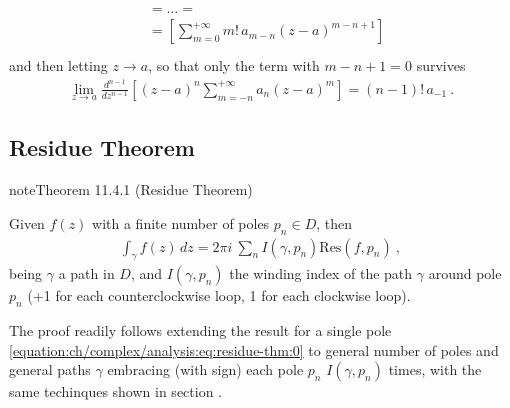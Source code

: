 \documentclass[letterpaper,10pt,english]{jupyterBook}
\begin{document}
\begin{itemize}
\begin{equation*}
\begin{split}
\begin{aligned}
    & = \dots = \\
    & = \left[ \sum_{m=0}^{+\infty} m! \, a_{m-n} (z-a)^{m-n+1} \right] \\
  \end{aligned}\end{split}
\end{equation*}
\sphinxAtStartPar
and then letting \(z \rightarrow a\), so that only the term with \(m-n+1 = 0\) survives
\begin{equation*}
\begin{split}\lim_{z \rightarrow a} \frac{d^{n-1}}{dz^{n-1}} \left[ (z-a)^n \sum_{m=-n}^{+\infty} a_n (z-a)^m \right] = (n-1)! \, a_{-1} \ .\end{split}
\end{equation*}
\end{itemize}


\subsection{Residue Theorem}
\label{\detokenize{ch/complex/analysis:residue-theorem}}\label{\detokenize{ch/complex/analysis:complex-analysis-mero-fun-residues-thm}}\label{ch/complex/analysis:theorem-6}
\begin{sphinxadmonition}{note}{Theorem 11.4.1 (Residue Theorem)}



\sphinxAtStartPar
Given \(f(z)\) with a finite number of poles \(p_n \in D\), then
\begin{equation*}
\begin{split}\int_{\gamma} f(z) \, dz = 2 \pi i \ \sum_{n} I(\gamma, p_n) \text{Res}(f,p_n) \ ,\end{split}
\end{equation*}
\sphinxAtStartPar
being \(\gamma\) a path in \(D\), and \(I(\gamma, p_n)\) the winding index of the path \(\gamma\) around pole \(p_n\) (+1 for each counter\sphinxhyphen{}clockwise loop, \sphinxhyphen{}1 for each clockwise loop).
\end{sphinxadmonition}

\sphinxAtStartPar
The proof readily follows extending the result for a single pole \eqref{equation:ch/complex/analysis:eq:residue-thm:0} to general number of poles and general paths \(\gamma\) embracing (with sign) each pole \(p_n\) \(I(\gamma,p_n)\) times, with the same techinques shown in section {\hyperref[\detokenize{ch/complex/analysis:complex-analysis-useful-int-path-independence-sum}]{}}.
\end{document}
